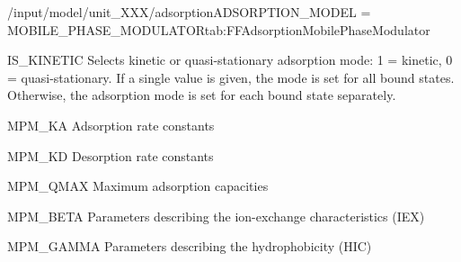 \begin{condsubgroup}{/input/model/unit\_XXX/adsorption}{ADSORPTION\_MODEL = MOBILE\_PHASE\_MODULATOR}{tab:FFAdsorptionMobilePhaseModulator}
\begin{dataset}[type=int,range={$\{ 0,1 \}$},length={1 / \texttt{NTOTALBND}}]{IS\_KINETIC}
    Selects kinetic or quasi-stationary adsorption mode: 1 = kinetic, 0 = quasi-stationary.
    If a single value is given, the mode is set for all bound states.
    Otherwise, the adsorption mode is set for each bound state separately.
  \end{dataset}
  \begin{dataset}[unit=\si{\cubic\metre\of{MP}\per\mol\per\second}, type=double,range={$\geq 0$},length={\texttt{NCOMP}}]{MPM\_KA}
    Adsorption rate constants
  \end{dataset}
  \begin{dataset}[unit=\si{\raiseto{3\beta}\metre\of{MP}\per\raiseto{\beta}\mol\per\second}, type=double,range={$\geq 0$},length={\texttt{NCOMP}}]{MPM\_KD}
    Desorption rate constants
  \end{dataset}
  \begin{dataset}[unit=\si{\mol\per\cubic\metre\of{SP}}, type=double,range={$\geq 0$},length={\texttt{NCOMP}}]{MPM\_QMAX}
    Maximum adsorption capacities
  \end{dataset}
  \begin{dataset}[unit=\si{\mol\per\cubic\metre\of{SP}}, type=double,range={$\geq 0$},length={\texttt{NCOMP}}]{MPM\_BETA}
    Parameters describing the ion-exchange characteristics (IEX)
  \end{dataset}
  \begin{dataset}[unit=\si{\cubic\metre\of{MP}\per\mol}, type=double,range={$\geq 0$},length={\texttt{NCOMP}}]{MPM\_GAMMA}
    Parameters describing the hydrophobicity (HIC)
  \end{dataset}
\end{condsubgroup}
  
